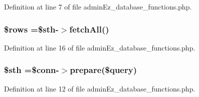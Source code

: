 Definition at line 7 of file admin\-Ez\-\_\-database\-\_\-functions.\-php.

\hypertarget{admin_ez__database__functions_8php_ace2ec39e7df3899fa8df9640ec274b03}{
\subsubsection[{\$rows}]{\setlength{\rightskip}{0pt plus 5cm}\$rows =\$sth-\/$>$fetch\-All()}}\label{admin_ez__database__functions_8php_ace2ec39e7df3899fa8df9640ec274b03}


Definition at line 16 of file admin\-Ez\-\_\-database\-\_\-functions.\-php.

\hypertarget{admin_ez__database__functions_8php_afa9126f9664959c02795be300a135f93}{
\subsubsection[{\$sth}]{\setlength{\rightskip}{0pt plus 5cm}\$sth =\$conn-\/$>$prepare(\$query)}}\label{admin_ez__database__functions_8php_afa9126f9664959c02795be300a135f93}


Definition at line 12 of file admin\-Ez\-\_\-database\-\_\-functions.\-php.

